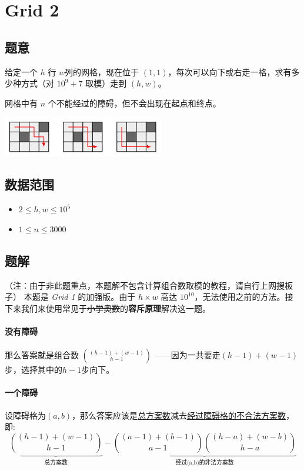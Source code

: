 \section{Grid 2}
\subsection*{题意}
给定一个 $h$ 行 $w$列的网格，现在位于 $(1,1)$，每次可以向下或右走一格，求有多少种方式（对 $10^9 + 7$ 取模）走到 $(h,w)$。

网格中有 $n$ 个不能经过的障碍，但不会出现在起点和终点。
\begin{center}
\includegraphics[width=7cm]{Pics/grid.png}
\end{center}
\subsection*{数据范围}
\begin{itemize}
\item $2 \leq h, w \leq 10^5$
\item $1 \leq n \leq 3000$
\end{itemize}


\subsection*{题解}

（注：由于非此题重点，本题解不包含计算组合数取模的教程，请自行上网搜板子）
本题是 \textit{Grid 1} 的加强版。由于 $h\times w$ 高达 $10^{10}$，无法使用之前的方法。接下来我们来使用常见于\sout{小学奥数}的\textbf{容斥原理}解决这一题。

\paragraph{没有障碍}那么答案就是组合数 $\binom{(h-1)+(w-1)}{h-1}$ ——因为一共要走$(h-1)+(w-1)$步，选择其中的$h-1$步向下。

\paragraph{一个障碍}设障碍格为$(a,b)$，那么答案应该是\uline{总方案数}减去\uline{经过障碍格的不合法方案数}，即:
$$
\underbrace{\binom{(h-1)+(w-1)}{h-1}}_{\text{总方案数}} - \underbrace{\binom{(a-1)+(b-1)}{a-1}\binom{(h-a)+(w-b)}{h-a}}_{\text{经过(a,b)的非法方案数}}
$$
